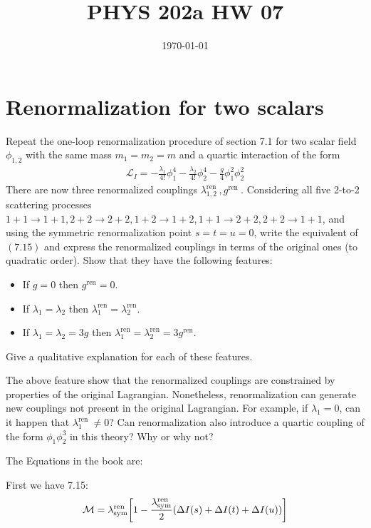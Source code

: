 \documentclass[12pt]{article}
\title{\vspace{-3em}PHYS 202a HW 07}
\date{\today}
\begin{document}
\maketitle

\section{Renormalization for two scalars}
\begin{problem}
  Repeat the one-loop renormalization procedure of section 7.1 for two scalar field $\phi_{1,2}$ with the same mass $m_1=m_2=m$ and a quartic interaction of the form
  \begin{align*}
    \mathcal{L}_I=-\frac{\lambda_1}{4 !} \phi_1^4-\frac{\lambda_2}{4 !} \phi_2^4-\frac{g}{4} \phi_1^2 \phi_2^2
  \end{align*}
  There are now three renormalized couplings $\lambda_{1,2}^{\text {ren }}, g^{\text {ren }}$. Considering all five 2-to-2 scattering processes $1+1 \rightarrow 1+1,2+2 \rightarrow 2+2,1+2 \rightarrow 1+2,1+1 \rightarrow 2+2,2+2 \rightarrow 1+1$, and using the symmetric renormalization point $s=t=u=0$, write the equivalent of $(7.15)$ and express the renormalized couplings in terms of the original ones (to quadratic order). Show that they have the following features:
  \begin{itemize}
  \item If $g=0$ then $g^{\text{ren}}=0$.
  \item If $\lambda_1=\lambda_2$ then
    $\lambda_1^{\text{ren}}=\lambda_2^ {\text{ren}}$.
  \item If $\lambda_1=\lambda_2=3 g$ then
    $\lambda_1^{\text{ren}}=\lambda_2^{\text{ren}}=3 g^{\text{ren}}$.
  \end{itemize}
  Give a qualitative explanation for each of these features.

  The above feature show that the renormalized couplings are constrained by properties of the original Lagrangian. Nonetheless, renormalization can generate new couplings not present in the original Lagrangian. For example, if $\lambda_1=0$, can it happen that $\lambda_1^{\text {ren }} \neq 0$? Can renormalization also introduce a quartic coupling of the form $\phi_1 \phi_2^3$ in this theory? Why or why not?
\end{problem}
The Equations in the book are:
\begin{thebook*}
  First we have 7.15:
  \begin{align*}
    \mathcal{M}=\lambda^{\text{ren}}_{\text{sym}}
    \qty[1-\frac{\lambda^{\text{ren}}_{\text{sym}}}
    2\qty(\Delta I(s)+\Delta I(t)+\Delta I(u))]
  \end{align*}
\end{thebook*}
\newpage
\end{document}
